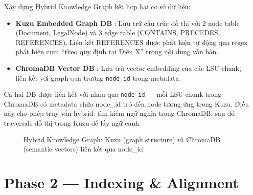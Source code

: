 Xây dựng Hybrid Knowledge Graph kết hợp hai cơ sở dữ liệu:

\begin{itemize}
    \item \textbf{Kuzu Embedded Graph DB} \cite{kuzu2024}: Lưu trữ cấu trúc đồ thị với 2 node table (Document, LegalNode) và 3 edge table (CONTAINS, PRECEDES, REFERENCES). Liên kết REFERENCES được phát hiện tự động qua regex phát hiện cụm ``theo quy định tại Điều X'' trong nội dung văn bản.
    \item \textbf{ChromaDB Vector DB} \cite{chromadb2024}: Lưu trữ vector embedding của các LSU chunk, liên kết với graph qua trường \texttt{node\_id} trong metadata.
\end{itemize}

Cả hai DB được liên kết với nhau qua \texttt{node\_id} — mỗi LSU chunk trong ChromaDB có metadata chứa node\_id trỏ đến node tương ứng trong Kuzu. Điều này cho phép truy vấn hybrid: tìm kiếm ngữ nghĩa trong ChromaDB, sau đó traversals đồ thị trong Kuzu để lấy ngữ cảnh.

\begin{figure}[H]
    \centering
    \caption{Hybrid Knowledge Graph: Kuzu (graph structure) và ChromaDB (semantic vectors) liên kết qua node\_id}
    \label{fig:hybrid_graph}
\end{figure}

\section{Phase 2 — Indexing \& Alignment}

